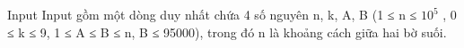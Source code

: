 Input  
Input gồm một dòng duy nhất chứa 4 số nguyên n, k, A, B (1 ≤ n ≤ $10^{5}$   , 0 ≤ k ≤ 9, 1 ≤ A ≤ B ≤ n, B ≤ 95000), trong đó n là khoảng cách giữa hai bờ suối.
